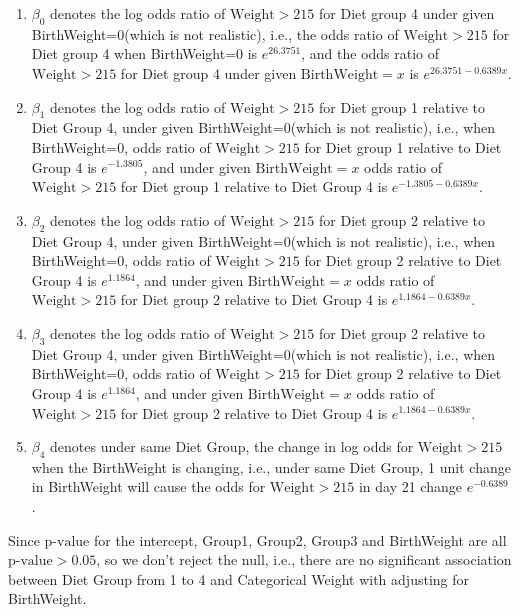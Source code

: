 \documentclass[10pt,letterpaper]{article}
\begin{document}
\begin{enumerate}[leftmargin=0cm,itemindent=.5cm,labelwidth=\itemindent,labelsep=0cm,align=left]
\begin{enumerate}[leftmargin=0cm,itemindent=.5cm,labelwidth=\itemindent,labelsep=0cm,align=left]
\item[\textbullet] $\beta_0$ denotes the log odds ratio of $\text{Weight}>215$ for Diet group 4 under given BirthWeight=0(which is not realistic), i.e., the odds ratio of $\text{Weight}>215$ for Diet group 4 when BirthWeight=0 is $e^{26.3751}$, and the odds ratio of $\text{Weight}>215$ for Diet group 4 under given $\text{BirthWeight}=x$ is $e^{26.3751-0.6389x}$.
\item[\textbullet] $\beta_1$ denotes the log odds ratio of $\text{Weight}>215$ for Diet group 1 relative to Diet Group 4, under given BirthWeight=0(which is not realistic), i.e., when BirthWeight=0, odds ratio of $\text{Weight}>215$ for Diet group 1 relative to Diet Group 4 is $e^{-1.3805}$, and under given $\text{BirthWeight}=x$ odds ratio of $\text{Weight}>215$ for Diet group 1 relative to Diet Group 4 is $e^{-1.3805-0.6389x}$.
\item[\textbullet] $\beta_2$ denotes the log odds ratio of $\text{Weight}>215$ for Diet group 2 relative to Diet Group 4, under given BirthWeight=0(which is not realistic), i.e., when BirthWeight=0, odds ratio of $\text{Weight}>215$ for Diet group 2 relative to Diet Group 4 is $e^{1.1864}$, and under given $\text{BirthWeight}=x$ odds ratio of $\text{Weight}>215$ for Diet group 2 relative to Diet Group 4 is $e^{1.1864-0.6389x}$.
\item[\textbullet] $\beta_3$ denotes the log odds ratio of $\text{Weight}>215$ for Diet group 2 relative to Diet Group 4, under given BirthWeight=0(which is not realistic), i.e., when BirthWeight=0, odds ratio of $\text{Weight}>215$ for Diet group 2 relative to Diet Group 4 is $e^{1.1864}$, and under given $\text{BirthWeight}=x$ odds ratio of $\text{Weight}>215$ for Diet group 2 relative to Diet Group 4 is $e^{1.1864-0.6389x}$.
\item[\textbullet] $\beta_4$ denotes under same Diet Group, the change in log odds for $\text{Weight}>215$ when the BirthWeight is changing, i.e., under same Diet Group, 1 unit change in BirthWeight will cause the odds for $\text{Weight}>215$ in day 21 change $e^{-0.6389}$.
\end{enumerate}
Since $\text{p-value}$ for the intercept, Group1, Group2, Group3 and BirthWeight are all $\text{p-value}>0.05$, so we don't reject the null, i.e., there are no significant association between Diet Group from 1 to 4 and Categorical Weight with adjusting for BirthWeight. 
\end{enumerate}
\end{document}
